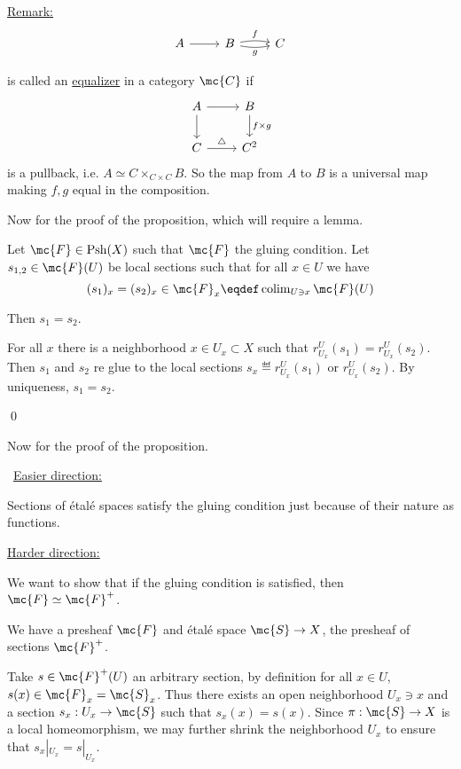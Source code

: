 \documentclass[x11names,reqno,14pt]{extarticle}
\DeclareMathOperator{\Psh}{Psh}
\begin{document}
\underline{Remark:}
\[
\begin{tikzcd}
A \ar[r] & B \ar[r, bend left = 10,"f"] \ar[r, bend right = 10,"g"'] & C
\end{tikzcd}
\]

is called an \underline{equalizer} in a category $\mc{C}$ if
\[
\begin{tikzcd}
A \ar[r] \ar[d]& B \ar[d, "f\times g"]\\
C \ar[r,"\bigtriangleup"] & C^2
\end{tikzcd}
\]
is a pullback, i.e. $A \simeq C\times_{C\times C}B$. So the map from $A$ to $B$ is a universal map making $f, g$ equal in the composition. 

Now for the proof of the proposition, which will require a lemma. 

\lem

Let $\mc{F} \in \Psh(X)$ such that $\mc{F}$ the gluing condition. Let $s_{1,2}\in\mc{F}(U)$ be local sections such that for all $x \in U$ we have
\[
(s_1)_x = (s_2)_x \in \mc{F}_x \eqdef \operatorname{colim}_{U\ni x}\mc{F}(U)
\]

Then $s_1 = s_2$. 

\proof

For all $x$ there is a neighborhood $x \in U_x \subset X$ such that $r^U_{U_x}(s_1) = r^U_{U_x}(s_2)$. Then $s_1$ and $s_2$ re glue to the local sections $s_x \eqdef r^U_{U_x}(s_1)$ or $r^U_{U_x}(s_2)$. By uniqueness, $s_1 = s_2$. 

\qed

Now for the proof of the proposition. 

\proof
\,
\underline{Easier direction:}

Sections of \'etal\'e spaces satisfy the gluing condition just because of their nature as functions.

\underline{Harder direction:}

We want to show that if the gluing condition is satisfied, then $\mc{F} \simeq \mc{F}^+$. 

We have a presheaf $\mc{F}$ and \'etal\'e space $\mc{S}\to X$, the presheaf of sections $\mc{F}^+$. 

Take $s \in \mc{F}^+(U)$ an arbitrary section, by definition for all $x \in U$, $s(x) \in \mc{F}_x = \mc{S}_x$. Thus there exists an open neighborhood $U_x\ni x$ and a section $s_x:U_x\to\mc{S}$ such that $s_x(x) = s(x)$. Since $\pi:\mc{S}\to X$ is a local homeomorphism, we may further shrink the neighborhood $U_x$ to ensure that $s_x|_{U_x} = s|_{U_x}$. 
\end{document}
